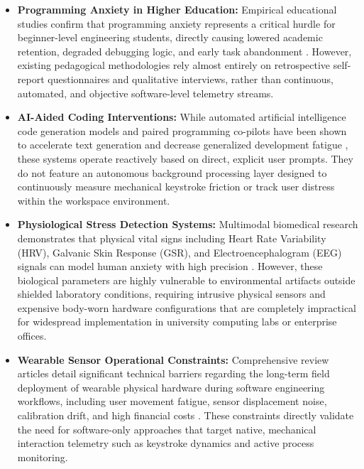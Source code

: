 \begin{itemize}
    \item \textbf{Programming Anxiety in Higher Education:} Empirical educational studies confirm that programming anxiety represents a critical hurdle for beginner-level engineering students, directly causing lowered academic retention, degraded debugging logic, and early task abandonment \cite{stemedu2025, springer2020}. However, existing pedagogical methodologies rely almost entirely on retrospective self-report questionnaires and qualitative interviews, rather than continuous, automated, and objective software-level telemetry streams.

    \item \textbf{AI-Aided Coding Interventions:} While automated artificial intelligence code generation models and paired programming co-pilots have been shown to accelerate text generation and decrease generalized development fatigue \cite{stemedu2025}, these systems operate reactively based on direct, explicit user prompts. They do not feature an autonomous background processing layer designed to continuously measure mechanical keystroke friction or track user distress within the workspace environment.

    \item \textbf{Physiological Stress Detection Systems:} Multimodal biomedical research demonstrates that physical vital signs including Heart Rate Variability (HRV), Galvanic Skin Response (GSR), and Electroencephalogram (EEG) signals can model human anxiety with high precision \cite{acm3653543, acm3469885}. However, these biological parameters are highly vulnerable to environmental artifacts outside shielded laboratory conditions, requiring intrusive physical sensors and expensive body-worn hardware configurations that are completely impractical for widespread implementation in university computing labs or enterprise offices.

    \item \textbf{Wearable Sensor Operational Constraints:} Comprehensive review articles detail significant technical barriers regarding the long-term field deployment of wearable physical hardware during software engineering workflows, including user movement fatigue, sensor displacement noise, calibration drift, and high financial costs \cite{mdpi389, core579951358}. These constraints directly validate the need for software-only approaches that target native, mechanical interaction telemetry such as keystroke dynamics and active process monitoring.


\end{itemize}
